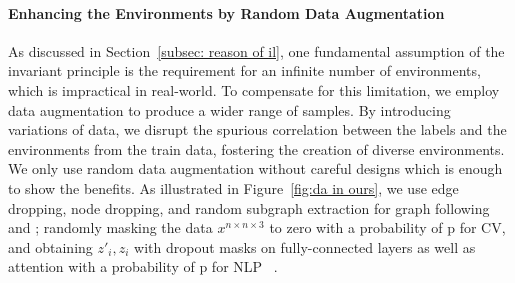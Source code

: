 





\paragraph{Enhancing the Environments by Random Data Augmentation} As discussed in Section~\ref{subsec: reason of il}, one fundamental assumption of the invariant principle is the requirement for an infinite number of environments, which is impractical in real-world. 
To compensate for this limitation, we employ data augmentation to produce a wider range of samples. 
By introducing variations of data, we disrupt the spurious correlation between the labels and the environments from the train data, fostering the creation of diverse environments. 
We only use random data augmentation without careful designs which is enough to show the benefits. 
As illustrated in Figure~\ref{fig:da in ours}, 
we use edge dropping, node dropping, and random subgraph extraction for graph following \citet{graphCL} and \citet{graph_aug}; randomly masking the data $x^{n\times n \times 3}$ to zero with a probability of p for CV, 
and obtaining $z'_i, z_i$ with dropout masks on fully-connected layers as well as attention with a probability of p for NLP ~\citep{Vaswani2017AttentionIA,gao2021simcse}. 

